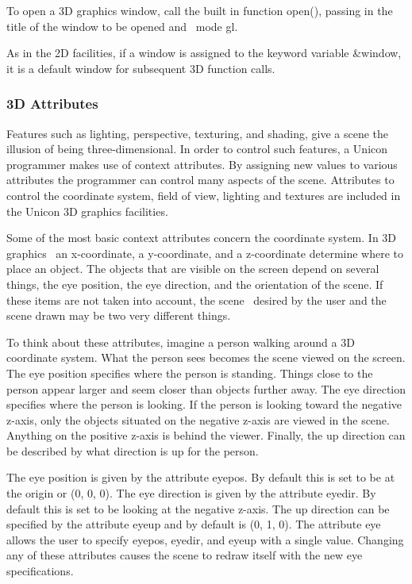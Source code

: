 To open a 3D graphics window, call the built in function open(), passing
in the title of the window to be opened and \ mode
{\textquotedbl}gl{\textquotedbl}.


As in the 2D facilities, if a window is assigned to the keyword variable
\&window, it is a default window for subsequent 3D function calls. 

\subsubsection{3D Attributes}

Features such as lighting, perspective, texturing, and shading, give a
scene the illusion of being three-dimensional. In order to control such
features, a Unicon programmer makes use of context attributes. By
assigning new values to various attributes the programmer can control
many aspects of the scene. Attributes to control the coordinate system,
field of view, lighting and textures are included in the Unicon 3D
graphics facilities. 

Some of the most basic context attributes concern the coordinate system.
In 3D graphics \ an x-coordinate, a y-coordinate, and a z-coordinate
determine where to place an object. The objects that are visible on the
screen depend on several things, the eye position, the eye direction,
and the orientation of the scene. If these items are not taken into
account, the scene \ desired by the user and the scene drawn may be two
very different things. 

To think about these attributes, imagine a person walking around a 3D
coordinate system. What the person sees becomes the scene viewed on the
screen. The eye position specifies where the person is standing. Things
close to the person appear larger and seem closer than objects further
away. The eye direction specifies where the person is looking. If the
person is looking toward the negative z-axis, only the objects situated
on the negative z-axis are viewed in the scene. Anything on the
positive z-axis is behind the viewer. Finally, the up direction can be
described by what direction is up for the person. 

The eye position is given by the attribute eyepos. By default this is
set to be at the origin or (0, 0, 0). The eye direction is given by the
attribute eyedir. By default this is set to be looking at the negative
z-axis. The up direction can be specified by the attribute eyeup and by
default is (0, 1, 0). The attribute eye allows the user to specify
eyepos, eyedir, and eyeup with a single value. Changing any of these
attributes causes the scene to redraw itself with the new eye
specifications.

